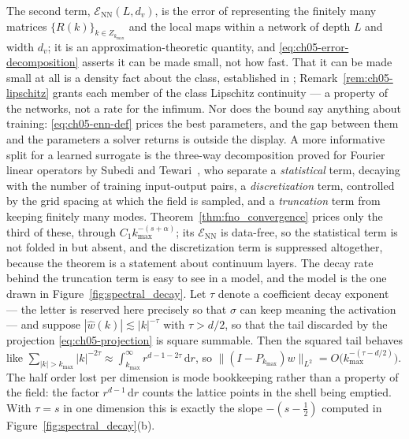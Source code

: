 The second term, $\mathcal{E}_{\text{NN}}(L,d_v)$, is
the error of representing the finitely many matrices
$\{R(k)\}_{k \in Z_{k_{\max}}}$ and the local maps within a network of depth
$L$ and width $d_v$; it is an approximation-theoretic quantity, and
\eqref{eq:ch05-error-decomposition} asserts it can be made small, not how fast.
That it can be made small at all is a density fact about the class, established
in ;
Remark~\ref{rem:ch05-lipschitz} grants each member of the class Lipschitz
continuity --- a property of the networks, not a rate for the infimum.
Nor does the bound say anything about training: \eqref{eq:ch05-enn-def} prices
the best parameters, and the gap between them and the parameters a solver
returns is outside the display.
A more informative split
for a learned surrogate is the three-way decomposition proved for Fourier
linear operators by Subedi and Tewari~\cite{subedi2024controlling}, who
separate a \emph{statistical} term, decaying with the number of training
input-output pairs, a \emph{discretization} term, controlled by the grid
spacing at which the field is sampled, and a \emph{truncation} term from
keeping finitely many modes. Theorem~\ref{thm:fno_convergence} prices only the third of these, through $C_1
k_{\max}^{-(s+\alpha)}$; its $\mathcal{E}_{\text{NN}}$ is data-free, so the statistical term is not
folded in but absent, and the discretization term is suppressed altogether, because the
theorem is a statement about continuum layers. The decay rate behind the truncation term is
easy to see in a model, and the model is the one drawn in
Figure~\ref{fig:spectral_decay}. Let $\tau$ denote a coefficient decay
exponent --- the letter is reserved here precisely so that $\sigma$ can keep
meaning the activation --- and suppose $|\hat{w}(k)| \lesssim |k|^{-\tau}$ with
$\tau > d/2$, so that the tail discarded by the projection
\eqref{eq:ch05-projection} is square summable. Then the squared tail behaves
like
$\sum_{|k| > k_{\max}} |k|^{-2\tau} \approx \int_{k_{\max}}^\infty
r^{d-1-2\tau}\,\mathrm{d}r$, so $\|(I - P_{k_{\max}})w\|_{L^2} =
O\big(k_{\max}^{-(\tau - d/2)}\big)$. The half order lost per dimension is mode
bookkeeping rather than a property of the field: the factor
$r^{d-1}\,\mathrm{d}r$ counts the lattice points in the shell being emptied.
With $\tau = s$ in one dimension this is exactly the slope
$-(s - \tfrac12)$ computed in Figure~\ref{fig:spectral_decay}(b).

